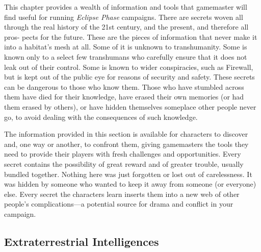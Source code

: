 This chapter provides a wealth of information and 
tools that gamemaster will find useful for running 
\textit{Eclipse Phase} campaigns.
There are secrets woven all through the real history of 
the 21st century, and the present, and therefore all pros-
pects for the future. These are the pieces of information 
that never make it into a habitat's mesh at all. Some of 
it is unknown to transhumanity. Some is known only 
to a select few transhumans who carefully ensure that 
it does not leak out of their control. Some is known to 
wider conspiracies, such as Firewall, but is kept out of 
the public eye for reasons of security and safety. These 
secrets can be dangerous to those who know them. 
Those who have stumbled across them have died for 
their knowledge, have erased their own memories (or 
had them erased by others), or have hidden themselves 
someplace other people never go, to avoid dealing with 
the consequences of such knowledge.

The information provided in this section is available 
for characters to discover and, one way or another, 
to confront them, giving gamemasters the tools they 
need to provide their players with fresh challenges and 
opportunities. Every secret contains the possibility of 
great reward and of greater trouble, usually bundled 
together. Nothing here was just forgotten or lost out 
of carelessness. It was hidden by someone who wanted 
to keep it away from someone (or everyone) else. 
Every secret the characters learn inserts them into a 
new web of other people's complications—a potential 
source for drama and conflict in your campaign.

\subsection{Extraterrestrial Intelligences}

